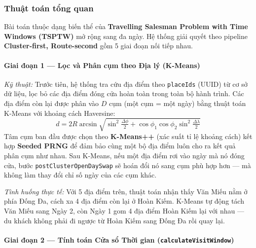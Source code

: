 \documentclass[12pt,a4paper]{article}
\begin{document}
\subsubsection{Thuật toán tổng quan}

Bài toán thuộc dạng biến thể của \textbf{Travelling Salesman Problem with Time
Windows (TSPTW)} mở rộng sang đa ngày. Hệ thống giải quyết theo pipeline
\textbf{Cluster-first, Route-second} gồm 5 giai đoạn nối tiếp nhau.

\paragraph{Giai đoạn 1 --- Lọc và Phân cụm theo Địa lý (K-Means)}

\textit{Kỹ thuật:} Trước tiên, hệ thống tra cứu địa điểm theo \texttt{placeIds}
(UUID) từ cơ sở dữ liệu, lọc bỏ các địa điểm đóng cửa hoàn toàn trong toàn bộ
hành trình. Các địa điểm còn lại được phân vào $D$ cụm (một cụm = một ngày)
bằng thuật toán K-Means với khoảng cách Haversine:
\[
  d = 2R \arcsin\!\sqrt{
    \sin^2\!\tfrac{\Delta\phi}{2}
    + \cos\phi_1\cos\phi_2\sin^2\!\tfrac{\Delta\lambda}{2}
  }
\]
Tâm cụm ban đầu được chọn theo \textbf{K-Means++} (xác suất tỉ lệ khoảng cách)
kết hợp \textbf{Seeded PRNG} để đảm bảo cùng một bộ địa điểm luôn cho ra kết
quả phân cụm như nhau. Sau K-Means, nếu một địa điểm rơi vào ngày mà nó đóng
cửa, bước \texttt{postClusterOpenDaySwap} sẽ hoán đổi nó sang cụm phù hợp hơn
--- mà không làm thay đổi chỉ số ngày của các cụm khác.

\medskip
\textit{Tình huống thực tế:} Với 5 địa điểm trên, thuật toán nhận thấy
Văn Miếu nằm ở phía Đống Đa, cách xa 4 địa điểm còn lại ở Hoàn Kiếm. K-Means
tự động tách Văn Miếu sang Ngày 2, còn Ngày 1 gom 4 địa điểm Hoàn Kiếm lại với
nhau --- du khách không phải đi ngược từ Hoàn Kiếm sang Đống Đa rồi quay lại.

\paragraph{Giai đoạn 2 --- Tính toán Cửa sổ Thời gian (\texttt{calculateVisitWindow})}
\end{document}
